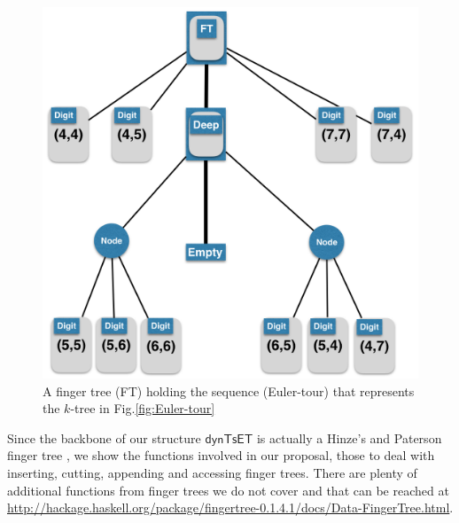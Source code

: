 \documentclass{elsarticle}
\newcommand{\MATHSF}[1]{\ensuremath{\mathsf{#1}}\xspace}
\newcommand{\dyntset}{\MATHSF{dynTsET}}
\begin{document}
\begin{figure}[H]
\begin{center}
\includegraphics[scale=0.35]{./Images/FT-Euler-tour} 
\end{center}
\caption{A finger tree (FT) holding the sequence (Euler-tour) that represents the $k$-tree in Fig.\ref{fig:Euler-tour}}
\label{fig:FT-Euler-tour}
\end{figure}

Since the backbone of our structure \dyntset is actually a Hinze's and Paterson finger tree \cite{FTs}, we show the functions involved in our proposal, those to deal with inserting, cutting, appending and accessing finger trees. There are plenty of additional functions from finger trees we do not cover and that can be reached at \url{http://hackage.haskell.org/package/fingertree-0.1.4.1/docs/Data-FingerTree.html}.
\end{document}
